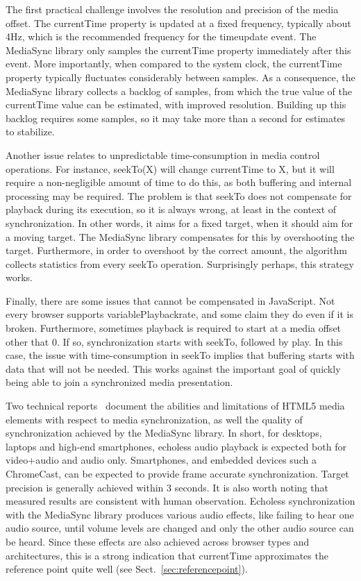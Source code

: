 The first practical challenge involves the resolution and precision of the
media offset. The currentTime property is updated at a fixed frequency,
typically about 4Hz, which is the recommended frequency for the timeupdate
event. The MediaSync library only samples the currentTime property immediately
after this event. More importantly, when compared to the system clock, the
currentTime property typically fluctuates considerably between samples. As a
consequence, the MediaSync library collects a backlog of samples, from which
the true value of the currentTime value can be estimated, with improved
resolution. Building up this backlog requires some samples, so it may take
more than a second for estimates to stabilize.

Another issue relates to unpredictable time-consumption in media control
operations. For instance, seekTo(X) will change currentTime to X, but it will
require a non-negligible amount of time to do this, as both buffering and
internal processing may be required. The problem is that seekTo does not
compensate for playback during its execution, so it is always wrong, at least
in the context of synchronization. In other words, it aims for a fixed target,
when it should aim for a moving target. The MediaSync library compensates for
this by overshooting the target. Furthermore, in order to overshoot by the
correct amount, the algorithm collects statistics from every seekTo operation.
Surprisingly perhaps, this strategy works.

Finally, there are some issues that cannot be compensated in JavaScript. Not
every browser supports variablePlaybackrate, and some claim they do even if it
is broken. Furthermore, sometimes playback is required to start at a media
offset other that 0. If so, synchronization starts with seekTo, followed by
play. In this case, the issue with time-consumption in seekTo implies that
buffering starts with data that will not be needed. This works against the
important goal of quickly being able to join a synchronized media
presentation.



Two technical reports~\cite{syncreport1,syncreport2} document the abilities and
limitations of HTML5 media elements with respect to media synchronization, as
well the quality of synchronization achieved by the MediaSync library. In
short, for desktops, laptops and high-end smartphones, echoless audio playback
is expected both for video+audio and audio only. Smartphones, and embedded
devices such a ChromeCast, can be expected to provide frame accurate
synchronization. Target precision is generally achieved within 3 seconds. It
is also worth noting that measured results are consistent with human
observation. Echoless synchronization with the MediaSync library produces
various audio effects, like failing to hear one audio source, until volume
levels are changed and only the other audio source can be heard. Since these
effects are also achieved across browser types and architectures, this is a
strong indication that currentTime approximates the reference point
quite well (see Sect.~\ref{sec:referencepoint}).

